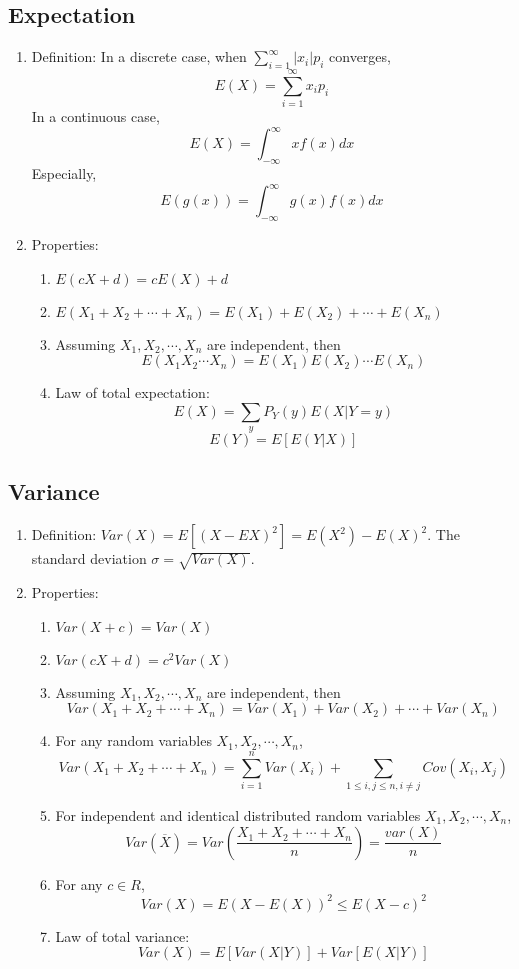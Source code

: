 \documentclass[a4paper]{article}
\begin{document}
\subsection{Expectation}
	\begin{enumerate}
	\item Definition: In a discrete case, when $\sum_{i=1}^\infty|x_i|p_i$ converges,
$$E(X)=\sum_{i=1}^\infty x_ip_i$$ 
In a continuous case,
$$E(X)=\int_{-\infty}^{\infty}xf(x)dx$$ 
Especially,
$$E(g(x))=\int_{-\infty}^{\infty}g(x)f(x)dx$$
	\item Properties:
		\begin{enumerate}
		\item $E(cX+d)=cE(X)+d$
		\item $E(X_1+X_2+\cdots+X_n)=E(X_1)+E(X_2)+\cdots+E(X_n)$
		\item Assuming $X_1, X_2, \cdots, X_n$ are independent, then
$$E(X_1X_2\cdots X_n)=E(X_1)E(X_2)\cdots E(X_n)$$
		\item Law of total expectation:
$$E(X)=\sum_yP_Y(y)E(X|Y=y)$$
$$E(Y)=E[E(Y|X)]$$
		\end{enumerate}
	\end{enumerate}

\subsection{Variance}
	\begin{enumerate}
	\item Definition: $Var(X)=E[(X-EX)^2]=E(X^2)-E(X)^2$. The standard deviation $\sigma=\sqrt{Var(X)}$.
	\item Properties:
		\begin{enumerate}
		\item $Var(X+c)=Var(X)$
		\item $Var(cX+d)=c^2Var(X)$
		\item Assuming $X_1, X_2, \cdots, X_n$ are independent, then 
$$Var(X_1+X_2+\cdots+X_n)=Var(X_1)+Var(X_2)+\cdots+Var(X_n)$$
		\item For any random variables $X_1, X_2, \cdots, X_n$,
$$Var(X_1+X_2+\cdots+X_n)=\sum_{i=1}^nVar(X_i)+\sum_{1\leq i,j\leq n,i\neq j}Cov(X_i,X_j)$$
		\item For independent and identical distributed random variables $X_1,X_2,\cdots,X_n$, 
$$Var(\overline{X})=Var(\frac{X_1+X_2+\cdots+X_n}{n})=\frac{var(X)}{n}$$
		\item For any $c\in R$,
$$Var(X)=E(X-E(X))^2\leq E(X-c)^2$$
		\item Law of total variance:
$$Var(X)=E[Var(X|Y)]+Var[E(X|Y)]$$
		\end{enumerate}
	\end{enumerate}
\end{document}
